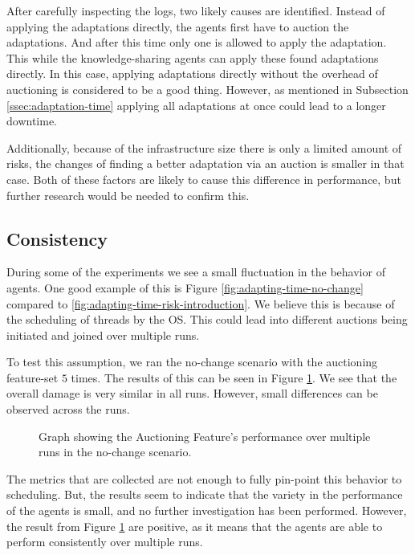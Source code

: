 After carefully inspecting the logs, two likely causes are identified. Instead of applying the adaptations directly, the agents first have to auction the adaptations. And after this time only one is allowed to apply the adaptation. This while the knowledge-sharing agents can apply these found adaptations directly. In this case, applying adaptations directly without the overhead of auctioning is considered to be a good thing. However, as mentioned in Subsection \ref{ssec:adaptation-time} applying all adaptations at once could lead to a longer downtime.

Additionally, because of the infrastructure size there is only a limited amount of risks, the changes of finding a better adaptation via an auction is smaller in that case. Both of these factors are likely to cause this difference in performance, but further research would be needed to confirm this.

%         


\subsection{Consistency}
\label{ssec:consecutive-runs}
During some of the experiments we see a small fluctuation in the behavior of agents. One good example of this is Figure \ref{fig:adapting-time-no-change} compared to \ref{fig:adapting-time-risk-introduction}. We believe this is because of the scheduling of threads by the OS. This could lead into different auctions being initiated and joined over multiple runs. 
 
To test this assumption, we ran the no-change scenario with the auctioning feature-set $5$ times. The results of this can be seen in Figure \ref{fig:multi-run-no-change}. We see that the overall damage is very similar in all runs. However, small differences can be observed across the runs.

\begin{figure}[H]
    \centering
        
    \caption{Graph showing the Auctioning Feature's performance over multiple runs in the no-change scenario.}
    \label{fig:multi-run-no-change}
\end{figure}

The metrics that are collected are not enough to fully pin-point this behavior to scheduling. But, the results seem to indicate that the variety in the performance of the agents is small, and no further investigation has been performed. However, the result from Figure \ref{fig:multi-run-no-change} are positive, as it means that the agents are able to perform consistently over multiple runs.
